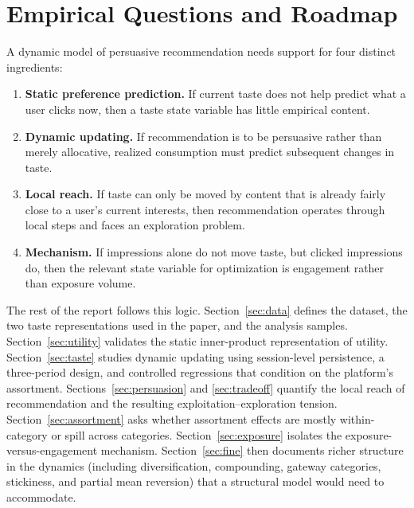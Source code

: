 \documentclass[11pt]{article}
\begin{document}
\section{Empirical Questions and Roadmap}

A dynamic model of persuasive recommendation needs support for four distinct ingredients:

\begin{enumerate}[leftmargin=1.5em, itemsep=0.25em, topsep=0.25em]
    \item \textbf{Static preference prediction.} If current taste does not help predict what a user clicks now, then a taste state variable has little empirical content.
    \item \textbf{Dynamic updating.} If recommendation is to be persuasive rather than merely allocative, realized consumption must predict subsequent changes in taste.
    \item \textbf{Local reach.} If taste can only be moved by content that is already fairly close to a user's current interests, then recommendation operates through local steps and faces an exploration problem.
    \item \textbf{Mechanism.} If impressions alone do not move taste, but clicked impressions do, then the relevant state variable for optimization is engagement rather than exposure volume.
\end{enumerate}

The rest of the report follows this logic. Section~\ref{sec:data} defines the dataset, the two taste representations used in the paper, and the analysis samples. Section~\ref{sec:utility} validates the static inner-product representation of utility. Section~\ref{sec:taste} studies dynamic updating using session-level persistence, a three-period design, and controlled regressions that condition on the platform's assortment. Sections~\ref{sec:persuasion} and \ref{sec:tradeoff} quantify the local reach of recommendation and the resulting exploitation--exploration tension. Section~\ref{sec:assortment} asks whether assortment effects are mostly within-category or spill across categories. Section~\ref{sec:exposure} isolates the exposure-versus-engagement mechanism. Section~\ref{sec:fine} then documents richer structure in the dynamics (including diversification, compounding, gateway categories, stickiness, and partial mean reversion) that a structural model would need to accommodate.

\end{document}
